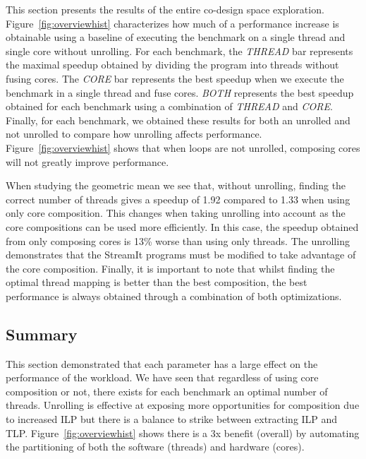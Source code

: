 This section  presents the results of the entire co-design space exploration.
Figure~\ref{fig:overviewhist} characterizes how much of a performance increase is obtainable using a baseline of executing the benchmark on a single thread and single core without unrolling.
For each benchmark, the \textit{THREAD} bar represents the maximal speedup obtained by dividing the program into threads without fusing cores.
The \textit{CORE} bar represents the best speedup when we execute the benchmark in a single thread and fuse cores.
\textit{BOTH} represents the best speedup obtained for each benchmark using a combination of \textit{THREAD} and \textit{CORE}.
Finally, for each benchmark, we obtained these results for both an unrolled and not unrolled to compare how unrolling affects performance.
Figure~\ref{fig:overviewhist} shows that when loops are not unrolled, composing cores will not greatly improve performance.

When studying the geometric mean we see that, without unrolling, finding the correct number of threads gives a speedup of 1.92 compared to 1.33 when using only core composition.
This changes when taking unrolling into account as the core compositions can be used more efficiently.
In this case, the speedup obtained from only composing cores is 13\% worse than using only threads. 
The unrolling demonstrates that the StreamIt programs must be modified to take advantage of the core composition.
Finally, it is important to note that whilst finding the optimal thread mapping is better than the best composition, the best performance is always obtained through a combination of both optimizations. 

\subsection{Summary}

This section demonstrated that each parameter has a large effect on the performance of the workload.
We have seen that regardless of using core composition or not, there exists for each benchmark an optimal number of threads.
Unrolling is effective at exposing more opportunities for composition due to increased ILP but there is a balance to strike between extracting ILP and TLP.
Figure~\ref{fig:overviewhist} shows there is a 3x benefit (overall) by automating the partitioning of both the software (threads) and hardware (cores).

